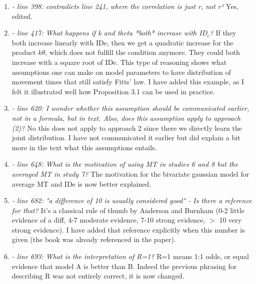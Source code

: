 \documentclass{article}
\begin{document}
\begin{enumerate}
    On optimal control and the link with deep RL, this was actually pointed out by Reviewer 3 who prefered separating the two concepts. The two concepts are quite close, and some fields will consider optimal control problem with a more or less large scope. The separation boils down to the fact that OFC is a standard method in motor control that has closed form solutions but has not demonstrated realistic movement time distributions, while the simulators are much less standard, can be quite contrived, take up a huge amount of ressources for training, and can likely generate movement time distributions but we have no way of knowing if they are realistic without actually using the simulation model.
    \item \textit{- line 398: contradicts line 241, where the correlation is just r, not r²} Yes, edited.
    \item \textit{- line 417: What happens if k and theta *both* increase with ID$_e$? } If they both increase linearly with IDe, then we get a quadratic increase for the product $k\theta$, which does not fulfill the condition anymore. They could both increase with a square root of IDe. This type of reasoning shows what assumptions one can make on model parameters to have distribution of movement times that still satisfy Fitts' law. I have added this example, as I felt it illustrated well how Proposition 3.1 can be used in practice.
    \item \textit{- line 620: I wonder whether this assumption should be communicated earlier, not in a formula, but in text. Also, does this assumption apply to approach (2)? } No this does not apply to approach 2 since there we directly learn the joint distribution.  I have not communicated it earlier but did explain a bit more in the text what this assumptions entails.
    \item \textit{- line 648: What is the motivation of using MT in studies 6 and 8 but the averaged MT in study 7? } The motivation for the bivariate gaussian model for average MT and IDe is now better explained.
    \item \textit{- line 682: "a difference of 10 is usually considered good" - Is there a reference for that? } It's a classical rule of thumb by Anderson and Burnham (0-2 little evidence of a diff, 4-7 moderate evidence, 7-10 strong evidence, $>$ 10 very strong evidence). I have added that reference explicitly when this number is given (the book was already referenced in the paper).
    \item \textit{- line 693: What is the interpretation of R=1? } R=1 means 1:1 odds, or equal evidence that model A is better than B. Indeed the previous phrasing for describing R was not entirely correct, it is now changed.

\end{enumerate}
\end{document}
